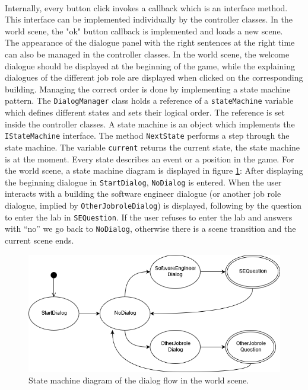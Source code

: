 \\Internally, every button click invokes a callback which is an interface method. This interface can be implemented individually by the controller classes. In the world scene, the "ok" button callback is implemented and loads a new scene. \\The appearance of the dialogue panel with the right sentences at the right time can also be managed in the controller classes. In the world scene, the welcome dialogue should be displayed at the beginning of the game, while the explaining dialogues of the different job role are displayed when clicked on the corresponding building. Managing the correct order is done by implementing a state machine pattern. The \texttt{DialogManager} class holds a reference of a \texttt{stateMachine} variable which defines different states and sets their logical order. The reference is set inside the controller classes. A state machine is an object which implements the \texttt{IStateMachine} interface. The method \texttt{NextState} performs a step through the state machine. The variable \texttt{current} returns the current state, the state machine is at the moment. Every state describes an event or a position in the game. For the world scene, a state machine diagram is displayed in figure \ref{fig:state-machine}: After displaying the beginning dialogue in \texttt{StartDialog}, \texttt{NoDialog} is entered. When the user interacts with a building the software engineer dialogue (or another job role dialogue, implied by \texttt{OtherJobroleDialog}) is displayed, following by the question to enter the lab in \texttt{SEQuestion}. If the user refuses to enter the lab and answers with ``no'' we go back to \texttt{NoDialog}, otherwise there is a scene transition and the current scene ends.\\
\begin{figure}[h]
  \includegraphics[width=14cm]{kapitel/dialog-state-diagram.png}
  \centering
  \caption{State machine diagram of the dialog flow in the world scene.}
  \label{fig:state-machine}
\end{figure}


